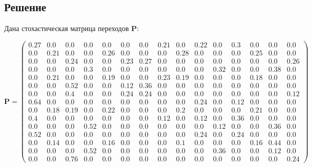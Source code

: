 \subsection{Решение}
Дана стохастическая матрица переходов $\mathbf{P}$:

$$\mathbf{P}=\begin{pmatrix}
0.27 & 0.0 & 0.0 & 0.0 & 0.0 & 0.0 & 0.0 & 0.21 & 0.0 & 0.22 & 0.0 & 0.3 & 0.0 & 0.0 & 0.0 \\
0.0 & 0.21 & 0.0 & 0.0 & 0.26 & 0.0 & 0.0 & 0.0 & 0.28 & 0.0 & 0.0 & 0.0 & 0.25 & 0.0 & 0.0 \\
0.0 & 0.0 & 0.24 & 0.0 & 0.0 & 0.23 & 0.27 & 0.0 & 0.0 & 0.0 & 0.0 & 0.0 & 0.0 & 0.0 & 0.26 \\
0.0 & 0.0 & 0.0 & 0.3 & 0.0 & 0.0 & 0.0 & 0.0 & 0.0 & 0.0 & 0.32 & 0.0 & 0.0 & 0.38 & 0.0 \\
0.0 & 0.21 & 0.0 & 0.0 & 0.19 & 0.0 & 0.0 & 0.23 & 0.19 & 0.0 & 0.0 & 0.0 & 0.18 & 0.0 & 0.0 \\
0.0 & 0.0 & 0.52 & 0.0 & 0.0 & 0.12 & 0.36 & 0.0 & 0.0 & 0.0 & 0.0 & 0.0 & 0.0 & 0.0 & 0.0 \\
0.0 & 0.0 & 0.4 & 0.0 & 0.0 & 0.24 & 0.24 & 0.0 & 0.0 & 0.0 & 0.0 & 0.0 & 0.0 & 0.0 & 0.12 \\
0.64 & 0.0 & 0.0 & 0.0 & 0.0 & 0.0 & 0.0 & 0.0 & 0.0 & 0.24 & 0.0 & 0.12 & 0.0 & 0.0 & 0.0 \\
0.0 & 0.18 & 0.19 & 0.0 & 0.22 & 0.0 & 0.0 & 0.0 & 0.2 & 0.0 & 0.0 & 0.0 & 0.21 & 0.0 & 0.0 \\
0.4 & 0.0 & 0.0 & 0.0 & 0.0 & 0.0 & 0.0 & 0.12 & 0.0 & 0.12 & 0.0 & 0.36 & 0.0 & 0.0 & 0.0 \\
0.0 & 0.0 & 0.0 & 0.52 & 0.0 & 0.0 & 0.0 & 0.0 & 0.0 & 0.0 & 0.12 & 0.0 & 0.0 & 0.36 & 0.0 \\
0.52 & 0.0 & 0.0 & 0.0 & 0.0 & 0.0 & 0.0 & 0.0 & 0.0 & 0.24 & 0.0 & 0.24 & 0.0 & 0.0 & 0.0 \\
0.0 & 0.14 & 0.0 & 0.0 & 0.16 & 0.0 & 0.0 & 0.0 & 0.1 & 0.0 & 0.0 & 0.0 & 0.16 & 0.44 & 0.0 \\
0.0 & 0.0 & 0.0 & 0.52 & 0.0 & 0.0 & 0.0 & 0.0 & 0.0 & 0.0 & 0.36 & 0.0 & 0.0 & 0.12 & 0.0 \\
0.0 & 0.0 & 0.76 & 0.0 & 0.0 & 0.0 & 0.0 & 0.0 & 0.0 & 0.0 & 0.0 & 0.0 & 0.0 & 0.0 & 0.24 
\end{pmatrix}$$

